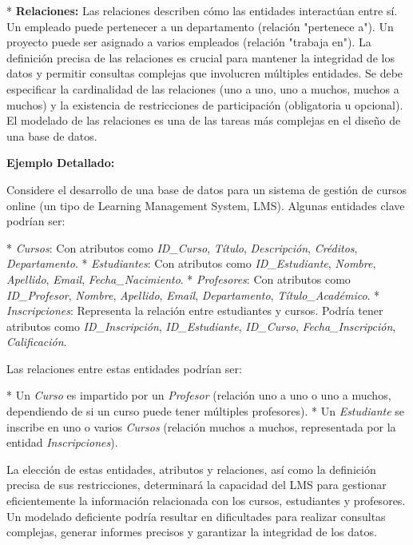 *   \textbf{Relaciones:} Las relaciones describen cómo las entidades interactúan entre sí. Un empleado puede pertenecer a un departamento (relación "pertenece a").  Un proyecto puede ser asignado a varios empleados (relación "trabaja en"). La definición precisa de las relaciones es crucial para mantener la integridad de los datos y permitir consultas complejas que involucren múltiples entidades.  Se debe especificar la cardinalidad de las relaciones (uno a uno, uno a muchos, muchos a muchos) y la existencia de restricciones de participación (obligatoria u opcional). El modelado de las relaciones es una de las tareas más complejas en el diseño de una base de datos.

\textbf{Ejemplo Detallado:}

Considere el desarrollo de una base de datos para un sistema de gestión de cursos online (un tipo de Learning Management System, LMS).  Algunas entidades clave podrían ser:

*   \textit{Cursos}:  Con atributos como \textit{ID\_Curso}, \textit{Título}, \textit{Descripción}, \textit{Créditos}, \textit{Departamento}.
*   \textit{Estudiantes}: Con atributos como \textit{ID\_Estudiante}, \textit{Nombre}, \textit{Apellido}, \textit{Email}, \textit{Fecha\_Nacimiento}.
*   \textit{Profesores}:  Con atributos como \textit{ID\_Profesor}, \textit{Nombre}, \textit{Apellido}, \textit{Email}, \textit{Departamento}, \textit{Título\_Académico}.
*   \textit{Inscripciones}:  Representa la relación entre estudiantes y cursos.  Podría tener atributos como \textit{ID\_Inscripción}, \textit{ID\_Estudiante}, \textit{ID\_Curso}, \textit{Fecha\_Inscripción}, \textit{Calificación}.

Las relaciones entre estas entidades podrían ser:

*   Un \textit{Curso} es impartido por un \textit{Profesor} (relación uno a uno o uno a muchos, dependiendo de si un curso puede tener múltiples profesores).
*   Un \textit{Estudiante} se inscribe en uno o varios \textit{Cursos} (relación muchos a muchos, representada por la entidad \textit{Inscripciones}).

La elección de estas entidades, atributos y relaciones, así como la definición precisa de sus restricciones, determinará la capacidad del LMS para gestionar eficientemente la información relacionada con los cursos, estudiantes y profesores. Un modelado deficiente podría resultar en dificultades para realizar consultas complejas, generar informes precisos y garantizar la integridad de los datos.

